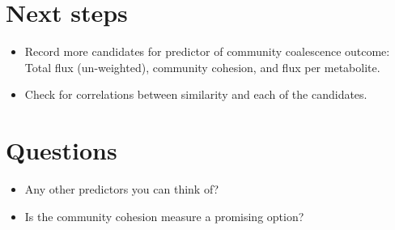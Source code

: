 \documentclass[10pt,letterpaper]{article}
\begin{document}
    	\section*{Next steps}
		    \begin{itemize}
		    	\item Record more candidates for predictor of community coalescence outcome: Total flux (un-weighted), community cohesion, and flux per metabolite.
		    	\item Check for correlations between similarity and each of the candidates.
		    \end{itemize}
    \section*{Questions}
    	\begin{itemize}
    		\item Any other predictors you can think of?
    		\item Is the community cohesion measure a promising option?
    	\end{itemize}


	
		
		
\end{document}

